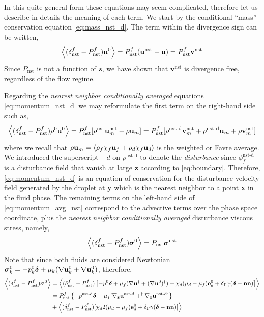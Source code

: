 In this quite general form these equations may seem complicated, therefore let us describe in details the meaning of each term. 
We start by the conditional ``mass'' conservation equation \eqref{eq:mass_nst_d}. 
The term within the divergence sign can be written,  
\begin{equation}
    \left<(\delta_\text{nst}^f - P_\text{nst}^f )\textbf{u}^0\right>
    = P_\text{nst}^f (\textbf{u}^\text{nst} - \textbf{u})
    = P_\text{nst}^f \textbf{v}^\text{nst}
\end{equation}
Since $P_\text{nst}$ is not a function of \textbf{z}, we have shown that $\textbf{v}^\text{nst}$ is divergence free, regardless of the flow regime. 

Regarding the \textit{nearest neighbor conditionally averaged} equations \eqref{eq:momentum_nst_d} we may reformulate the first term on the right-hand side such as, 
\begin{equation}
    \left<(\delta_\text{nst}^f - P_\text{nst}^f)\rho^0 \textbf{u}^0\right>
    = P_\text{nst}^f [
        \rho^\text{nst}\textbf{u}_m^\text{nst}
        - 
        \rho \textbf{u}_m
    ]
    = P_\text{nst}^f [
        \rho^\text{nst-d}\textbf{v}^\text{nst}_m
        + \rho^\text{nst-d}\textbf{u}_m
        + \rho \textbf{v}^\text{nst}_m
    ]
\end{equation}
where we recall that $\rho \textbf{u}_m = \left<\rho_f\chi_f \textbf{u}_f + \rho_d\chi_f  \textbf{u}_d\right>$ is the weighted or Favre average.
We introduced the superscript $-d$ on $\rho^\text{nst-d}$ to denote the \textit{disturbance} since $\phi_f^\text{nst-d}$ is a disturbance field that vanish at large $\textbf{z}$ according to \ref{eq:boundary}. 
Therefore, \ref{eq:momentum_nst_d} is an equation of conservation for the disturbance velocity field generated by the droplet at \textbf{y} which is the nearest neighbor to a point \textbf{x} in the fluid phase. 
The remaining terms on the left-hand side of \ref{eq:momentum_avg_nst} correspond to the advective terms over the phase space coordinate, plus the \textit{nearest neighbor conditionally averaged } disturbance viscous stress, namely, 
\begin{equation}
    \left<(\delta_\text{nst}^f - P_\text{nst}^f) \bm\sigma^0\right>
    = P_\text{nst} \bm\sigma^\text{nst}
\end{equation}
Note that since both fluids are considered Newtonian $\bm\sigma_k^0 = -p_k^0\bm\delta + \mu_k (\mathbf{\nabla} \textbf{u}_k^0 + \mathbf{\nabla} \textbf{u}_k^0)$, therefore,
\begin{align}
    \left<(\delta_\text{nst}^f - P_\text{nst}^f) \bm\sigma^0\right>
    &=
    \left<(\delta_\text{nst}^f - P_\text{nst}^f) 
    \left[
    - p^0 \bm\delta 
    + \mu_f(\mathbf{\nabla} \textbf{u}^\dagger + (\mathbf{\nabla} \textbf{u}^0)^\dagger )
    + \chi_d (\mu_d-\mu_f)\textbf{e}_d^0 
    + \delta_\Gamma \gamma (\bm\delta - \textbf{nn})
    \right]
    \right>\nonumber \\
    &=
    P_\text{nst}^f\left\{
        -p^\text{nst-d}\bm\delta 
        + \mu_f [{\mathbf{\nabla}_\textbf{z}} \textbf{u}^\text{nst-d}+^\dagger{\mathbf{\nabla}_\textbf{z}} \textbf{u}^\text{nst-d}]
    \right\}\nonumber\\
   &+  \left<(\delta_\text{nst}^f - P_\text{nst}^f)[
    \chi_d  2 (\mu_d-\mu_f)\textbf{e}_d^0 
    + \delta_\Gamma \gamma (\bm\delta - \textbf{nn})]
    \right>
\end{align}
